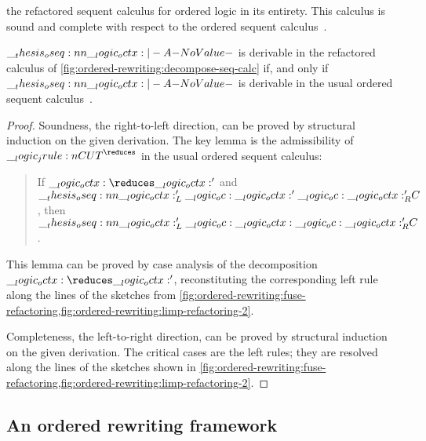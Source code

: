  the refactored sequent calculus for ordered logic in its entirety.
This calculus is sound and complete with respect to the ordered sequent calculus~.
%
\begin{theorem}
  $\oseq{\octx |- A}$ is derivable in the refactored calculus of \cref{fig:ordered-rewriting:decompose-seq-calc} if, and only if $\oseq{\octx |- A}$ is derivable in the usual ordered sequent calculus~.
\end{theorem}
%
\begin{proof}
  Soundness, the right-to-left direction, can be proved by structural induction on the given derivation.
  The key lemma is the admissibility of $\jrule{CUT}^{\reduces}$ in the usual ordered sequent calculus:
  \begin{quotation}
    \normalsize If $\octx \reduces \octx'$ and $\oseq{\octx'_L \oc \octx' \oc \octx'_R |- C}$, then $\oseq{\octx'_L \oc \octx \oc \octx'_R |- C}$.
  \end{quotation}
  This lemma can be proved by case analysis of the decomposition $\octx \reduces \octx'$, reconstituting the corresponding left rule along the lines of the sketches from \cref{fig:ordered-rewriting:fuse-refactoring,fig:ordered-rewriting:limp-refactoring-2}.

%
%
  Completeness, the left-to-right direction, can be proved by structural induction on the given derivation.
  The critical cases are the left rules; they are resolved along the lines of the sketches shown in \cref{fig:ordered-rewriting:fuse-refactoring,fig:ordered-rewriting:limp-refactoring-2}.
\end{proof}

\subsection{An ordered rewriting framework}\label{sec:ordered-rewriting:unfocused}

